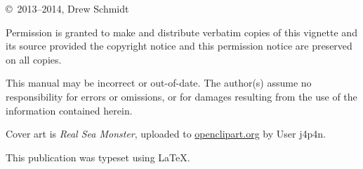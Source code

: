 
\null
\vfill
\copyright\ 2013--2014, Drew Schmidt

Permission is granted to make and distribute verbatim copies of
this vignette and its source provided the copyright notice and
this permission notice are preserved on all copies.

This manual may be incorrect or out-of-date.  The author(s) assume
no responsibility for errors or omissions, or for damages resulting
from the use of the information contained herein.

Cover art is \textit{Real Sea Monster}, uploaded to \url{openclipart.org} by 
User j4p4n.

This publication was typeset using \LaTeX.
